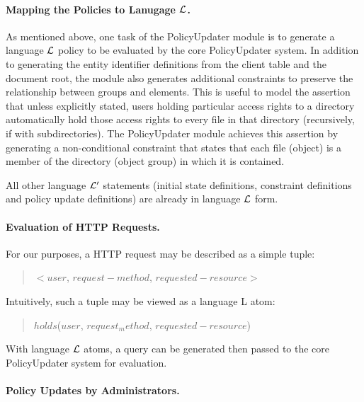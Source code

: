 \documentclass{llncs}
\begin{document}
      \paragraph{\bf Mapping the Policies to Lanugage ${\cal L}$.}

        As mentioned above, one task of the PolicyUpdater module is to generate
        a language ${\cal L}$ policy to be evaluated by the core PolicyUpdater
        system. In addition to generating the entity identifier definitions
        from the client table and the document root, the module also generates
        additional constraints to preserve the relationship between groups
        and elements. This is useful to model the assertion that unless
        explicitly stated, users holding particular access rights to a
        directory automatically hold those access rights to every file in
        that directory (recursively, if with subdirectories). The PolicyUpdater
        module achieves this assertion by generating a non-conditional
        constraint that states that each file (object) is a member of the
        directory (object group) in which it is contained.

        All other language ${\cal L'}$ statements (initial state definitions,
        constraint definitions and policy update definitions) are already in
        language ${\cal L}$ form.

      \paragraph{\bf Evaluation of HTTP Requests.}

        For our purposes, a HTTP request may be described as a simple tuple:

        \begin{quote}
          $<$$user$, $request-method$, $requested-resource$$>$
        \end{quote}

        Intuitively, such a tuple may be viewed as a language {\cal L} atom:

        \begin{quote}
          $holds$($user$, $request_method$, $requested-resource$)
        \end{quote}

        With language ${\cal L}$ atoms, a query can be generated then passed to
        the core PolicyUpdater system for evaluation.

      \paragraph{\bf Policy Updates by Administrators.}
\end{document}
